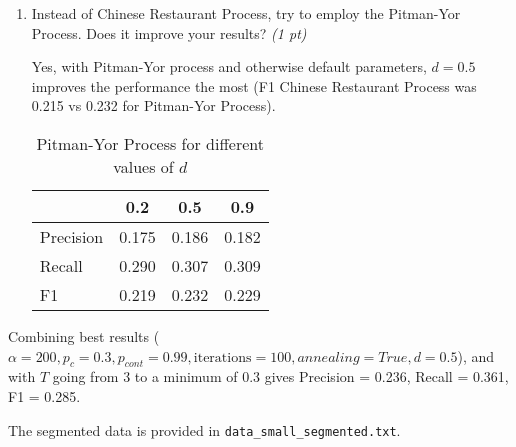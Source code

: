 \documentclass[a4paper]{article}
\begin{document}
\begin{enumerate}
	\item Instead of Chinese Restaurant Process, try to employ the Pitman-Yor
		Process. Does it improve your results? \textit{(1 pt)}

        Yes, with Pitman-Yor process and otherwise default parameters, $d=0.5$
        improves the performance the most (F1 Chinese Restaurant Process was
        0.215 vs 0.232 for Pitman-Yor Process).

		\begin{table}[H]
			\centering
			\caption{Pitman-Yor Process for different values of $d$}
			\label{tab:pyor}
			\begin{tabular}{l|c|c|c}
			& 0.2 & 0.5 & 0.9 \\
			\hline
				Precision & 0.175 & 0.186 & 0.182 \\
				Recall & 0.290 & 0.307 & 0.309 \\
				F1 & 0.219 & 0.232 & 0.229
			\end{tabular}
		\end{table}

\end{enumerate}

Combining best results ($\alpha = 200, p_c = 0.3, p_{cont} = 0.99,
\text{iterations} = 100, annealing = True, d = 0.5$), and with $T$ going from 3
to a minimum of 0.3 gives Precision = 0.236, Recall = 0.361, F1 = 0.285.

The segmented data is provided in \texttt{data\_small\_segmented.txt}.
\end{document}
